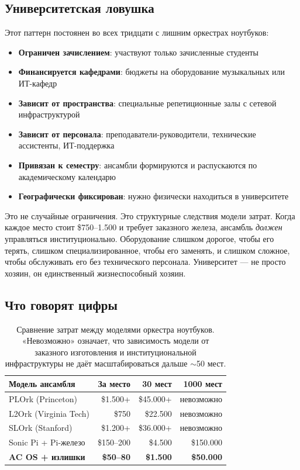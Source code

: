 \documentclass[10pt,letterpaper,twocolumn]{article}
\begin{document}
\subsection{Университетская ловушка}

Этот паттерн постоянен во всех тридцати с лишним оркестрах ноутбуков:

\begin{itemize}
  \item \textbf{Ограничен зачислением}: участвуют только зачисленные студенты
  \item \textbf{Финансируется кафедрами}: бюджеты на оборудование музыкальных или ИТ-кафедр
  \item \textbf{Зависит от пространства}: специальные репетиционные залы с сетевой инфраструктурой
  \item \textbf{Зависит от персонала}: преподаватели-руководители, технические ассистенты, ИТ-поддержка
  \item \textbf{Привязан к семестру}: ансамбли формируются и распускаются по академическому календарю
  \item \textbf{Географически фиксирован}: нужно физически находиться в университете
\end{itemize}

Это не случайные ограничения. Это структурные следствия модели затрат. Когда каждое место стоит \$750--1.500 и требует заказного железа, ансамбль \emph{должен} управляться институционально. Оборудование слишком дорогое, чтобы его терять, слишком специализированное, чтобы его заменять, и слишком сложное, чтобы обслуживать его без технического персонала. Университет --- не просто хозяин, он единственный жизнеспособный хозяин.

\subsection{Что говорят цифры}

\begin{table}[h]
\small
\centering
\begin{tabular}{lrrr}
\toprule
\textbf{Модель ансамбля} & \textbf{За место} & \textbf{30 мест} & \textbf{1000 мест} \\
\midrule
PLOrk (Princeton)       & \$1.500+ & \$45.000+ & невозможно \\
L2Ork (Virginia Tech)   & \$750      & \$22.500  & невозможно \\
SLOrk (Stanford)        & \$1.200+ & \$36.000+ & невозможно \\
Sonic Pi + Pi-железо    & \$150--200 & \$4.500   & \$150.000 \\
\textbf{AC OS + излишки} & \textbf{\$50--80} & \textbf{\$1.500} & \textbf{\$50.000} \\
\bottomrule
\end{tabular}
\caption{Сравнение затрат между моделями оркестра ноутбуков. «Невозможно» означает, что зависимость модели от заказного изготовления и институциональной инфраструктуры не даёт масштабироваться дальше $\sim$50 мест.}
\label{tab:cost}
\end{table}
\end{document}
